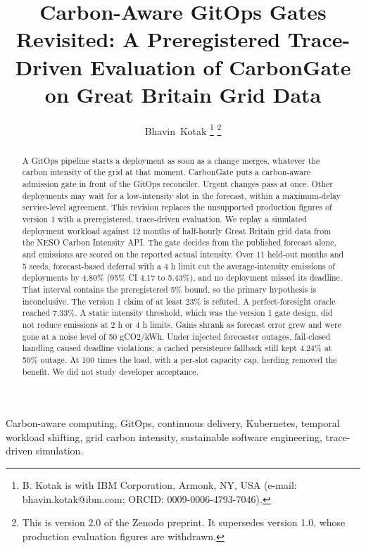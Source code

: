 \documentclass[journal]{IEEEtran}
\begin{document}
\title{Carbon-Aware GitOps Gates Revisited: A Preregistered Trace-Driven Evaluation of CarbonGate on Great Britain Grid Data}

\author{Bhavin~Kotak%
\thanks{B. Kotak is with IBM Corporation, Armonk, NY, USA (e-mail: bhavin.kotak@ibm.com; ORCID: 0009-0006-4793-7046).}%
\thanks{This is version 2.0 of the Zenodo preprint. It supersedes version 1.0, whose production evaluation figures are withdrawn.}}


\maketitle

\begin{abstract}
A GitOps pipeline starts a deployment as soon as a change merges, whatever the carbon intensity of the grid at that moment. CarbonGate puts a carbon-aware admission gate in front of the GitOps reconciler. Urgent changes pass at once. Other deployments may wait for a low-intensity slot in the forecast, within a maximum-delay service-level agreement. This revision replaces the unsupported production figures of version 1 with a preregistered, trace-driven evaluation. We replay a simulated deployment workload against 12 months of half-hourly Great Britain grid data from the NESO Carbon Intensity API. The gate decides from the published forecast alone, and emissions are scored on the reported actual intensity. Over 11 held-out months and 5 seeds, forecast-based deferral with a 4 h limit cut the average-intensity emissions of deployments by 4.80\% (95\% CI 4.17 to 5.43\%), and no deployment missed its deadline. That interval contains the preregistered 5\% bound, so the primary hypothesis is inconclusive. The version 1 claim of at least 23\% is refuted. A perfect-foresight oracle reached 7.33\%. A static intensity threshold, which was the version 1 gate design, did not reduce emissions at 2 h or 4 h limits. Gains shrank as forecast error grew and were gone at a noise level of 50 gCO2/kWh. Under injected forecaster outages, fail-closed handling caused deadline violations; a cached persistence fallback still kept 4.24\% at 50\% outage. At 100 times the load, with a per-slot capacity cap, herding removed the benefit. We did not study developer acceptance.
\end{abstract}

\begin{IEEEkeywords}
Carbon-aware computing, GitOps, continuous delivery, Kubernetes, temporal workload shifting, grid carbon intensity, sustainable software engineering, trace-driven simulation.
\end{IEEEkeywords}
\end{document}
